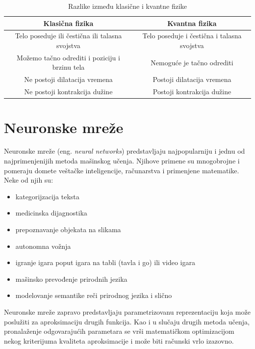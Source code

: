 \documentclass[a4paper]{article}
\begin{document}
\begin{table}[h!]
\begin{center}
\begin{tabular}{|c|c|} \hline
Klasična fizika& Kvantna fizika\\ \hline
Telo poseduje ili čestična ili talasna svojstva & Telo poseduje i čestična i talasna svojstva\\ 
Možemo tačno odrediti i poziciju i brzinu tela &Nemoguće je tačno odrediti\\ 
Ne postoji dilatacija vremena& Postoji dilatacija vremena \\ 
Ne postoji kontrakcija dužine& Postoji kontrakcija dužine\\ \hline
\end{tabular}
\caption{Razlike između klasične i kvantne fizike}
\label{tab:tabela1}
\end{center}
\end{table}

\section{Neuronske mreže}
\label{sec:naslov1}

Neuronske mreže (eng. {\textit{neural networks}}) predstavljaju najpopularniju i jednu od najprimenjenijih metoda mašinskog učenja. Njihove primene su mnogobrojne i pomeraju domete veštačke inteligencije, računarstva i primenjene matematike. Neke od njih su:
\begin{itemize}
  \item kategorijzacija teksta
  \item medicinska dijagnostika
  \item prepoznavanje objekata na slikama
  \item autonomna vožnja
  \item igranje igara poput igara na tabli (tavla i go) ili video igara
  \item mašinsko prevođenje prirodnih jezika
  \item modelovanje semantike reči prirodnog jezika i slično
\end{itemize}
Neuronske mreže zapravo predstavljaju parametrizovanu reprezentaciju koja može poslužiti za aproksimaciju drugih funkcija. Kao i u slučaju drugih metoda učenja, pronalaženje odgovarajućih parametara se vrši matematičkom optimizacijom nekog kriterijuma kvaliteta aproksimacije i može biti računski vrlo izazovno.
\end{document}
